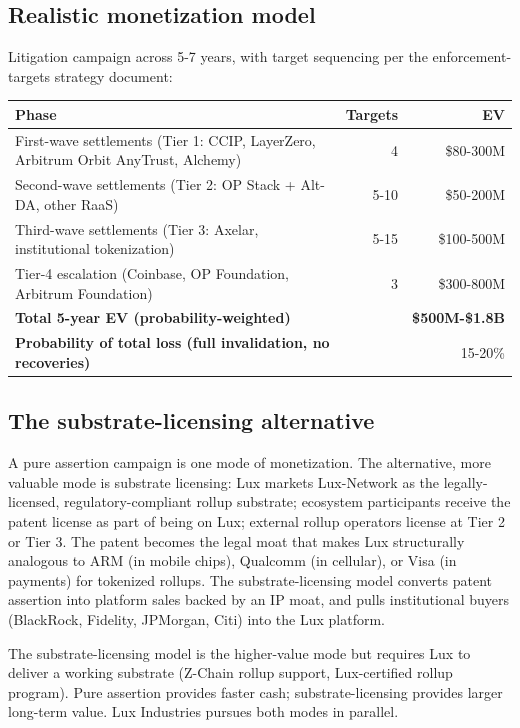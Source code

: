 \documentclass[11pt,letterpaper]{article}
\begin{document}
\subsection{Realistic monetization model}

Litigation campaign across 5-7 years, with target sequencing per the enforcement-targets strategy document:

\begin{longtable}{lrr}
\toprule
\textbf{Phase} & \textbf{Targets} & \textbf{EV} \\
\midrule
First-wave settlements (Tier 1: CCIP, LayerZero, Arbitrum Orbit AnyTrust, Alchemy) & 4 & \$80-300M \\
Second-wave settlements (Tier 2: OP Stack + Alt-DA, other RaaS) & 5-10 & \$50-200M \\
Third-wave settlements (Tier 3: Axelar, institutional tokenization) & 5-15 & \$100-500M \\
Tier-4 escalation (Coinbase, OP Foundation, Arbitrum Foundation) & 3 & \$300-800M \\
\midrule
\textbf{Total 5-year EV (probability-weighted)} & & \textbf{\$500M-\$1.8B} \\
\textbf{Probability of total loss (full invalidation, no recoveries)} & & 15-20\% \\
\bottomrule
\end{longtable}

\subsection{The substrate-licensing alternative}

A pure assertion campaign is one mode of monetization. The alternative, more valuable mode is substrate licensing: Lux markets Lux-Network as the legally-licensed, regulatory-compliant rollup substrate; ecosystem participants receive the patent license as part of being on Lux; external rollup operators license at Tier 2 or Tier 3. The patent becomes the legal moat that makes Lux structurally analogous to ARM (in mobile chips), Qualcomm (in cellular), or Visa (in payments) for tokenized rollups. The substrate-licensing model converts patent assertion into platform sales backed by an IP moat, and pulls institutional buyers (BlackRock, Fidelity, JPMorgan, Citi) into the Lux platform.

The substrate-licensing model is the higher-value mode but requires Lux to deliver a working substrate (Z-Chain rollup support, Lux-certified rollup program). Pure assertion provides faster cash; substrate-licensing provides larger long-term value. Lux Industries pursues both modes in parallel.
\end{document}
